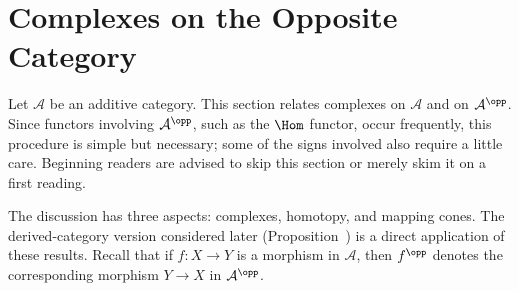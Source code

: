 
\section{Complexes on the Opposite Category}\label{sec:opposite-cplx}
\hypertarget{o014.aljabr2.chapter3.opposite-category-complexes}{ }

Let $\mathcal{A}$ be an additive category. This section relates complexes on
$\mathcal{A}$ and on $\mathcal{A}^{\opp}$. Since functors involving
$\mathcal{A}^{\opp}$, such as the $\Hom$ functor, occur frequently, this
procedure is simple but necessary; some of the signs involved also require a
little care. Beginning readers are advised to skip this section or merely
skim it on a first reading.

The discussion has three aspects: complexes, homotopy, and mapping cones. The
derived-category version considered later
(Proposition~) is a direct application of these results. Recall that if
$f:X\to Y$ is a morphism in $\mathcal{A}$, then $f^{\opp}$ denotes the
corresponding morphism $Y\to X$ in $\mathcal{A}^{\opp}$.

